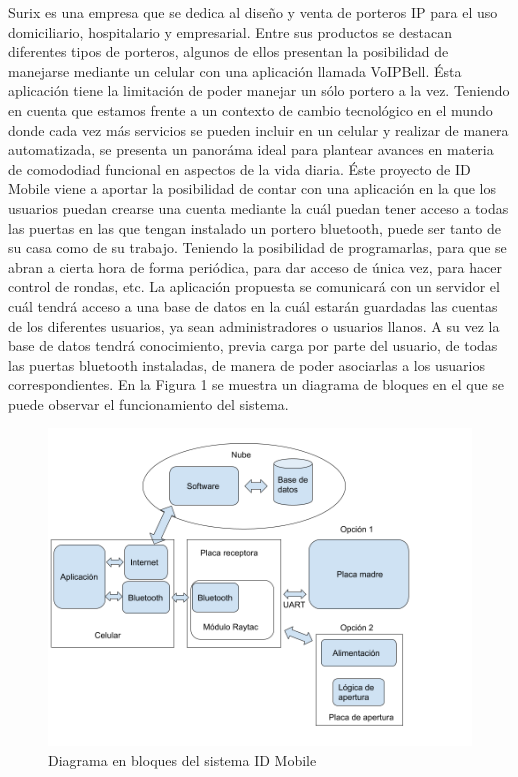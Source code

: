 \documentclass[11pt]{charter}
\begin{document}
Surix es una empresa que se dedica al diseño y venta de porteros IP para el uso domiciliario, hospitalario y empresarial. 
Entre sus productos se destacan diferentes tipos de porteros, algunos de ellos presentan la posibilidad de manejarse mediante un celular con una aplicación llamada VoIPBell. Ésta aplicación tiene la limitación de poder manejar un sólo portero a la vez. \newline
Teniendo en cuenta que estamos frente a un contexto de cambio tecnológico en el mundo donde cada vez más servicios se pueden incluir en un celular y realizar de manera automatizada, se presenta un panoráma ideal para plantear avances en materia de comododiad funcional en aspectos de la vida diaria. \newline
Éste proyecto de ID Mobile viene a aportar la posibilidad de contar con una aplicación en la que los usuarios puedan crearse una cuenta mediante la cuál puedan tener acceso a todas las puertas en las que tengan instalado un portero bluetooth, puede ser tanto de su casa como de su trabajo. Teniendo la posibilidad de programarlas, para que se abran a cierta hora de forma periódica, para dar acceso de única vez, para hacer control de rondas, etc. La aplicación propuesta se comunicará con un servidor el cuál tendrá acceso a una base de datos en la cuál estarán guardadas las cuentas de los diferentes usuarios, ya sean administradores o usuarios llanos. A su vez la base de datos tendrá conocimiento, previa carga por parte del usuario, de todas las puertas bluetooth instaladas, de manera de poder asociarlas a los usuarios correspondientes. En la Figura 1 se muestra un diagrama de bloques en el que se puede observar el funcionamiento del sistema. 

\vspace{25px}

\begin{figure}[htpb]
\centering 
\includegraphics[width=.9\textwidth]{./Figuras/Diagramadebloques_planificacion.png}
\caption{Diagrama en bloques del sistema ID Mobile}
\label{fig:diagBloques}
\end{figure}
\end{document}
